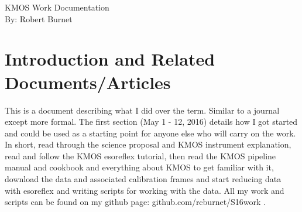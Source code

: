\documentclass[10pt,letterpaper]{article}
\begin{document}
\begin{center}
KMOS Work Documentation\\
By: Robert Burnet
\end{center}

\newpage

\tableofcontents

\newpage

\section{Introduction and Related Documents/Articles}

This is a document describing what I did over the term. Similar to a journal except more formal. The first section (May 1 - 12, 2016) details how I got started and could be used as a starting point for anyone else who will carry on the work. In short, read through the science proposal and KMOS instrument explanation, read and follow the KMOS esoreflex tutorial, then read the KMOS pipeline manual and cookbook and everything about KMOS to get familiar with it, download the data and associated calibration frames and start reducing data with esoreflex and writing scripts for working with the data. All my work and scripts can be found on my github page: github.com/rcburnet/S16work .
\end{document}
